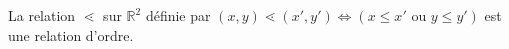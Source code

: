 La relation $\lessdot$ sur $\mathbb R^2$ définie par $(x,y) \lessdot (x',y') \iff (x\leq x' \text{ ou } y\leq y')$ est une relation d'ordre.

\begin{reponses}
\end{reponses}


